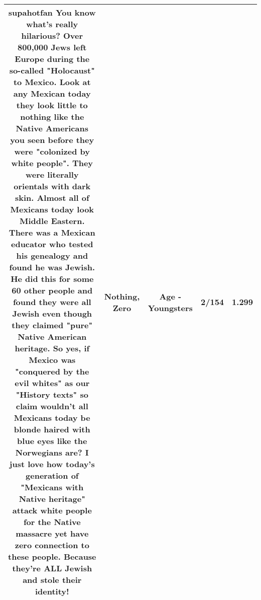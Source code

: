 \documentclass[11pt]{article}
\newlength\mylength
\begin{document}
\begin{center}
\begin{longtable}{|C{.65\mylength}|C{.30\mylength}|C{.12\mylength}|C{.12\mylength}|C{.12\mylength}|}
  \small supahotfan You know what's really hilarious? Over 800,000 Jews left Europe during the so-called "Holocaust" to Mexico. Look at any Mexican today they look little to \textbf{nothing} like the Native Americans you seen before they were "colonized by white people". They were literally orientals with dark skin. Almost all of Mexicans today look Middle Eastern. There was a Mexican educator who tested his genealogy and found he was Jewish. He did this for some 60 other people and found they were all Jewish even though they claimed "pure" Native American heritage. So yes, if Mexico was "conquered by the evil whites" as our "History texts" so claim wouldn't all Mexicans today be blonde haired with blue eyes like the Norwegians are? I just love how today's generation of "Mexicans with Native heritage" attack white people for the Native massacre yet have \textbf{zero} connection to these people. Because they're ALL Jewish and stole their identity!\normalsize   & Nothing, Zero & Age - Youngsters & 2/154 & 1.299 \\  \hline

\end{longtable}
\end{center}
\end{document}
